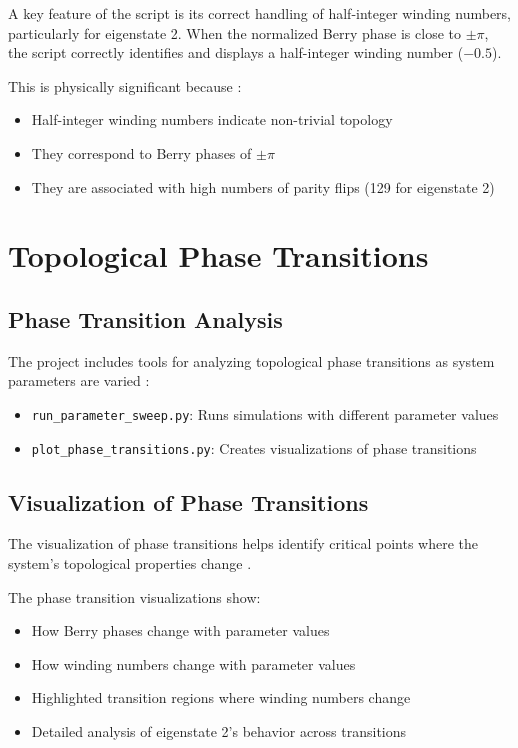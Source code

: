 \documentclass{article}
\begin{document}
A key feature of the script is its correct handling of half-integer winding numbers, particularly for eigenstate 2. When the normalized Berry phase is close to $\pm\pi$, the script correctly identifies and displays a half-integer winding number ($-0.5$).

This is physically significant because \cite{Tse2010, Hsieh2009, Zeng2024}:

\begin{itemize}
    \item Half-integer winding numbers indicate non-trivial topology
    \item They correspond to Berry phases of $\pm\pi$
    \item They are associated with high numbers of parity flips (129 for eigenstate 2)
\end{itemize}

\section{Topological Phase Transitions}

\subsection{Phase Transition Analysis}

The project includes tools for analyzing topological phase transitions as system parameters are varied \cite{Moore2010, Qi2010, Wen2017, Chiu2016}:

\begin{itemize}
    \item \texttt{run\_parameter\_sweep.py}: Runs simulations with different parameter values
    \item \texttt{plot\_phase\_transitions.py}: Creates visualizations of phase transitions
\end{itemize}

\subsection{Visualization of Phase Transitions}

The visualization of phase transitions helps identify critical points where the system's topological properties change \cite{Shen2017, Asboth2016}.

The phase transition visualizations show:

\begin{itemize}
    \item How Berry phases change with parameter values
    \item How winding numbers change with parameter values
    \item Highlighted transition regions where winding numbers change
    \item Detailed analysis of eigenstate 2's behavior across transitions
\end{itemize}
\end{document}
